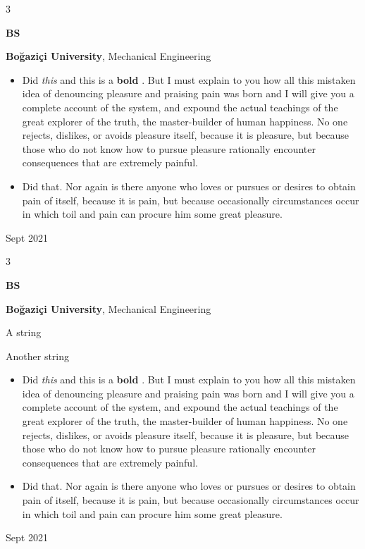 \documentclass[10pt, letterpaper]{article}
\newenvironment{summary}{
    \begin{description}[
        topsep=0.10 cm,
        parsep=0.10 cm,
        partopsep=0pt,
        itemsep=0pt,
        leftmargin=0.4 cm + 10pt
    ]
}{
    \end{description}
} %
\newenvironment{highlights}{
    \begin{itemize}[
        topsep=0.10 cm,
        parsep=0.10 cm,
        partopsep=0pt,
        itemsep=0pt,
        leftmargin=0.4 cm + 10pt
    ]
}{
    \end{itemize}
} %
\newenvironment{threecolentry}[3][]{
    \onecolentry
    \def\thirdColumn{#3}
    \setcolumnwidth{1 cm, \fill, 4.5 cm}
    \begin{paracol}{3}
    {\raggedright #2} \switchcolumn
}{
    \switchcolumn \raggedleft \thirdColumn
    \end{paracol}
    \endonecolentry
} %
\let\hrefWithoutArrow\href
\renewcommand{\href}[2]{\hrefWithoutArrow{#1}{\ifthenelse{\equal{#2}{}}{ }{#2 }\raisebox{.15ex}{\footnotesize \faExternalLink*}}}
\begin{document}
        \begin{threecolentry}{\textbf{BS}}{
            Sept 2021
        }
            \textbf{Boğaziçi University}, Mechanical Engineering
            \begin{highlights}
                \item Did \textit{this} and this is a \textbf{bold} \href{https://example.com}{link}. But I must explain to you how all this mistaken idea of denouncing pleasure and praising pain was born and I will give you a complete account of the system, and expound the actual teachings of the great explorer of the truth, the master-builder of human happiness. No one rejects, dislikes, or avoids pleasure itself, because it is pleasure, but because those who do not know how to pursue pleasure rationally encounter consequences that are extremely painful.
                \item Did that. Nor again is there anyone who loves or pursues or desires to obtain pain of itself, because it is pain, but because occasionally circumstances occur in which toil and pain can procure him some great pleasure.
            \end{highlights}
        \end{threecolentry}

        \vspace{0.2 cm}

        \begin{threecolentry}{\textbf{BS}}{
            Sept 2021
        }
            \textbf{Boğaziçi University}, Mechanical Engineering
            \begin{summary}
                \item A string
                \item Another string
            \end{summary}
            \begin{highlights}
                \item Did \textit{this} and this is a \textbf{bold} \href{https://example.com}{link}. But I must explain to you how all this mistaken idea of denouncing pleasure and praising pain was born and I will give you a complete account of the system, and expound the actual teachings of the great explorer of the truth, the master-builder of human happiness. No one rejects, dislikes, or avoids pleasure itself, because it is pleasure, but because those who do not know how to pursue pleasure rationally encounter consequences that are extremely painful.
                \item Did that. Nor again is there anyone who loves or pursues or desires to obtain pain of itself, because it is pain, but because occasionally circumstances occur in which toil and pain can procure him some great pleasure.
            \end{highlights}
        \end{threecolentry}
\end{document}
